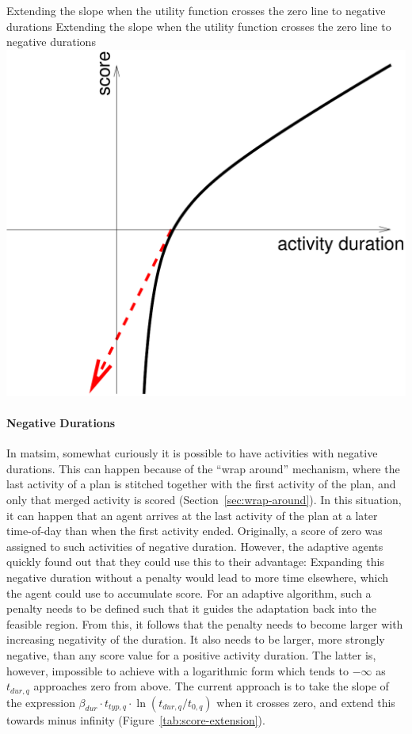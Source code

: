 \createfigure%
{Extending the slope when the utility function crosses the zero line to negative durations}%
{Extending the slope when the utility function crosses the zero line to negative durations}%
{\label{tab:score-extension}}%
{\includegraphics[width=0.4\hsize,trim=0 0 0 0,clip]{using/figures/score-extension}}%
{}

\paragraph*{Negative Durations}

In \gls{matsim}, somewhat curiously it is possible to have activities with negative durations. This can happen because of the ``wrap around'' mechanism, where the last activity of a plan is stitched together with the first activity of the plan, and only that merged activity is scored (\cf Section~\ref{sec:wrap-around}). 
In this situation,
it can happen that an agent arrives at the last activity of the plan at a later time-of-day than when the first activity ended.  Originally, a score of zero was assigned to such activities of negative duration. However, the adaptive agents quickly found out that they could use this to their advantage: Expanding this negative duration without a penalty would lead to more time elsewhere, which the agent could use to accumulate score. %
%
For an adaptive \gls{algorithm}, such a penalty needs to be defined such that it guides the adaptation back into the feasible region. From this, it follows that the penalty needs to become larger with increasing negativity of the duration. It also needs to be larger, \ie more strongly negative, than any score value for a positive activity duration.  The latter is, however, impossible to achieve with a logarithmic form which tends to $-\infty$ as $t_{dur,q}$ approaches zero from above. The current approach is to take the slope of the expression $\beta_{dur} \cdot t_{typ,q} \cdot \ln( t_{dur,q} / t_{0,q} )$ when it crosses zero, and extend this towards minus infinity (Figure~\ref{tab:score-extension}).

